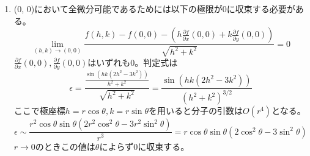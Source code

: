 \begin{souanswer}
\begin{enumerate}
	\item (0, 0)において全微分可能であるためには以下の極限が0に収束する必要がある。
\begin{equation*}
	\lim_{(h, k)\to (0, 0)} \frac{f(h, k)- f(0, 0)- \left(h\frac{\partial f}{\partial x}(0, 0)+ k\frac{\partial f}{\partial y}(0, 0)\right)}{\sqrt{h^2+ k^2}}= 0
\end{equation*}
	$\frac{\partial f}{\partial x}(0, 0), \frac{\partial f}{\partial y}(0, 0)$はいずれも0。判定式は
\begin{equation*}
	\epsilon= \frac{\frac{\sin(hk(2h^2- 3k^2))}{h^2+ k^2}}{\sqrt{h^2+ k^2}}= \frac{\sin{(hk(2h^2- 3k^2))}}{(h^2+ k^2)^{3/2}}
\end{equation*}
	ここで極座標$h= r\cos{\theta}, k= r\sin{\theta}$を用いると分子の引数は$O(r^4)$となる。
\begin{equation*}
	\epsilon\sim \frac{r^2\cos{\theta}\sin{\theta}(2r^2\cos^2{\theta}- 3r^2\sin^2{\theta})}{r^3}= r\cos{\theta}\sin{\theta}(2\cos^2{\theta}- 3\sin^2{\theta})
\end{equation*}
	$r\to 0$のときこの値は$\theta$によらず0に収束する。
\end{enumerate}
\end{souanswer}